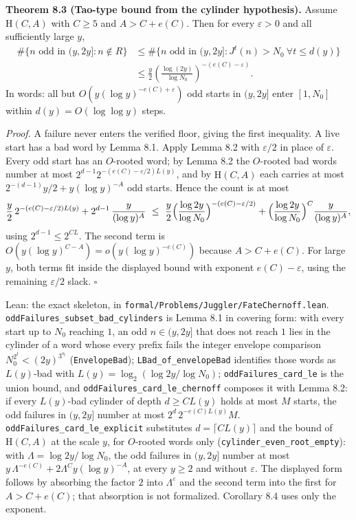 \documentclass[11pt,a4paper]{article}
\begin{document}
\textbf{Theorem 8.3 (Tao-type bound from the cylinder hypothesis).}
Assume \(\mathrm H(C,A)\) with \(C\ge 5\) and \(A>C+e(C)\). Then for
every \(\varepsilon>0\) and all sufficiently large \(y\), \[
\begin{aligned}
\#\{n\text{ odd in }(y,2y]:n\notin R\}
&\le\#\{n\text{ odd in }(y,2y]:J^t(n)>N_0\ \forall t\le d(y)\}\\
&\le\frac y2\left(\frac{\log(2y)}{\log N_0}\right)^{-(e(C)-\varepsilon)}.
\end{aligned}
\] In words: all but \(O(y(\log y)^{-e(C)+\varepsilon})\) odd starts in
\((y,2y]\) enter \([1,N_0]\) within \(d(y)=O(\log\log y)\) steps.

\emph{Proof.} A failure never enters the verified floor, giving the
first inequality. A live start has a bad word by Lemma 8.1. Apply Lemma
8.2 with \(\varepsilon/2\) in place of \(\varepsilon\). Every odd start
has an \(O\)-rooted word; by Lemma 8.2 the \(O\)-rooted bad words number
at most \(2^{d-1}2^{-(e(C)-\varepsilon/2)L(y)}\), and by
\(\mathrm H(C,A)\) each carries at most \(2^{-(d-1)}y/2+y(\log y)^{-A}\)
odd starts. Hence the count is at most \[
\frac y2\,2^{-(e(C)-\varepsilon/2)L(y)}+2^{d-1}\,\frac{y}{(\log y)^A}
\ \le\ \frac y2\Bigl(\frac{\log 2y}{\log N_0}\Bigr)^{-(e(C)-\varepsilon/2)}
+\Bigl(\frac{\log 2y}{\log N_0}\Bigr)^{C}\frac{y}{(\log y)^{A}},
\] using \(2^{d-1}\le 2^{CL}\). The second term is
\(O(y(\log y)^{C-A})=o(y(\log y)^{-e(C)})\) because \(A>C+e(C)\). For
large \(y\), both terms fit inside the displayed bound with exponent
\(e(C)-\varepsilon\), using the remaining \(\varepsilon/2\) slack.
\(\square\)

Lean: the exact skeleton, in
\texttt{\nolinkurl{formal/Problems/Juggler/FateChernoff.lean}}.
\texttt{\nolinkurl{oddFailures_subset_bad_cylinders}} is Lemma 8.1 in
covering form: with every start up to \(N_0\) reaching \(1\), an odd
\(n\in(y,2y]\) that does not reach \(1\) lies in the cylinder of a word
whose every prefix fails the integer envelope comparison
\(N_0^{2^t}<(2y)^{3^{o_t}}\) (\texttt{\nolinkurl{EnvelopeBad}});
\texttt{\nolinkurl{LBad_of_envelopeBad}} identifies those words as
\(L(y)\)-bad with \(L(y)=\log_2(\log 2y/\log N_0)\);
\texttt{\nolinkurl{oddFailures_card_le}} is the union bound, and
\texttt{\nolinkurl{oddFailures_card_le_chernoff}} composes it with Lemma
8.2: if every \(L(y)\)-bad cylinder of depth \(d\ge CL(y)\) holds at
most \(M\) starts, the odd failures in \((y,2y]\) number at most
\(2^d\,2^{-e(C)L(y)}M\).
\texttt{\nolinkurl{oddFailures_card_le_explicit}} substitutes
\(d=\lceil CL(y)\rceil\) and the bound of \(\mathrm H(C,A)\) at the
scale \(y\), for \(O\)-rooted words only
(\texttt{\nolinkurl{cylinder_even_root_empty}}): with
\(\Lambda=\log 2y/\log N_0\), the odd failures in \((y,2y]\) number at
most \(y\,\Lambda^{-e(C)}+2\Lambda^{C}y(\log y)^{-A}\), at every
\(y\ge 2\) and without \(\varepsilon\). The displayed form follows by
absorbing the factor \(2\) into \(\Lambda^{\varepsilon}\) and the second
term into the first for \(A>C+e(C)\); that absorption is not formalized.
Corollary 8.4 uses only the exponent.
\end{document}
